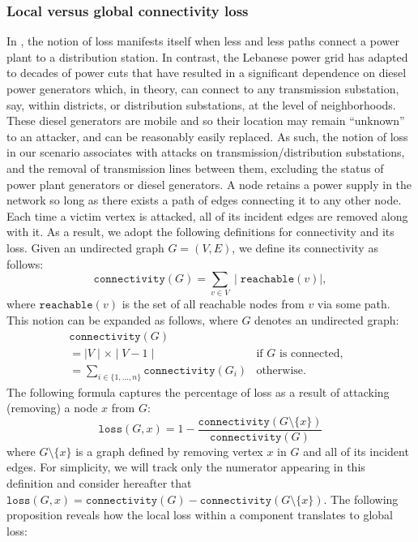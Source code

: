 \subsubsection{Local versus global connectivity loss}
In \cite{2000Natur.406..378A}, the notion of loss manifests itself when less and less paths connect a power plant to a distribution station. In contrast, the Lebanese power grid has adapted to decades of power cuts that have resulted in a significant dependence on diesel power generators which, in theory, can connect to any transmission substation, say, within districts, or distribution substations, at the level of neighborhoods. These diesel generators are mobile and so their location may remain ``unknown'' to an attacker, and can be reasonably easily replaced. As such, the notion of loss in our scenario associates with attacks on transmission/distribution substations, and the removal of transmission lines between them, excluding the status of power plant generators or diesel generators. A node retains a power supply in the network so long as there exists a path of edges connecting it to any other node. Each time a victim vertex is attacked, all of its incident edges are removed along with it. As a result, we adopt the following definitions for connectivity and its loss. Given an undirected graph $G=(V,E)$, we define its connectivity as follows:
$$
\mathtt{connectivity}(G) = \sum_{v \in V} \mid \mathtt{reachable}(v) \mid,
$$
where $\mathtt{reachable}(v)$ is the set of all reachable nodes from $v$ via some path. 
This notion can be expanded as follows, where $G$ denotes an undirected graph:
\begin{equation}
\begin{array}{llr}
\mathtt{connectivity}(G) && \\
=  \mid V \mid \times \mid V-1 \mid & \mbox{if $G$ is connected,}& \\
 =  \sum_{i \in \{1,\ldots,n\}} \mathtt{connectivity}(G_i) & \mbox{otherwise.}&
\end{array}
\label{def}
\end{equation}
The following formula captures the percentage of loss as a result of attacking (removing) a node $x$ from $G$:
$$
\mathtt{loss}(G, x) = 1 - \frac{\mathtt{connectivity}(G \setminus \{x\})}{\mathtt{connectivity}(G)}
$$
where $G \setminus \{x\}$ is a graph defined by removing vertex $x$ in $G$ and all of its incident edges. For simplicity, we will track only the numerator appearing in this definition and consider hereafter that $\mathtt{loss}(G,x) = \mathtt{connectivity}(G)-\mathtt{connectivity}(G \setminus \{x\})$. The following proposition reveals how the local loss within a component translates to global loss:
